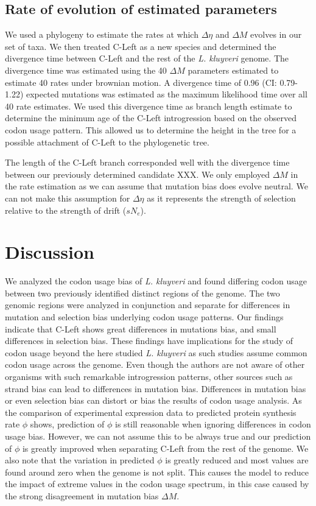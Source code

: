 \documentclass[12pt,draft]{article}
\begin{document}
\subsection*{Rate of evolution of estimated parameters}
We used a phylogeny to estimate the rates at which $\Delta \eta$ and $\Delta M$ evolves in our set of taxa. 
We then treated C-Left as a new species and determined the divergence time between C-Left and the rest of the \textit{L. kluyveri} genome.
The divergence time was estimated using the 40 $\Delta M$ parameters estimated to estimate 40 rates under brownian motion. 
A divergence time of 0.96 (CI: 0.79-1.22) expected mutations was estimated as the maximum likelihood time over all 40 rate estimates.
We used this divergence time as branch length estimate to determine the minimum age of the C-Left introgression based on the observed codon usage pattern.
This allowed us to determine the height in the tree for a possible attachment of C-Left to the phylogenetic tree.

The length of the C-Left branch corresponded well with the divergence time between our previously determined candidate XXX. 
We only employed $\Delta M$ in the rate estimation as we can assume that mutation bias does evolve neutral.
We can not make this assumption for $\Delta \eta$ as it represents the strength of selection relative to the strength of drift ($sN_e$).

\section*{Discussion}

We analyzed the codon usage bias of \textit{L. kluyveri} and found differing codon usage between two previously identified distinct regions of the genome. 
The two genomic regions were analyzed in conjunction and separate for differences in mutation and selection bias underlying codon usage patterns.
Our findings indicate that C-Left shows great differences in mutations bias, and small differences in selection bias.
These findings have implications for the study of codon usage beyond the here studied \textit{L. kluyveri} as such studies assume common codon usage across the genome.
Even though the authors are not aware of other organisms with such remarkable introgression patterns, other sources such as strand bias can lead to differences in mutation bias.
Differences in mutation bias or even selection bias can distort or bias the results of codon usage analysis. 
As the comparison of experimental expression data to predicted protein synthesis rate $\phi$ shows, prediction of $\phi$ is still reasonable when ignoring differences in codon usage bias. 
However, we can not assume this to be always true and our prediction of $\phi$ is greatly improved when separating C-Left from the rest of the genome.
We also note that the variation in predicted $\phi$ is greatly reduced and most values are found around zero when the genome is not split.
This causes the model to reduce the impact of extreme values in the codon usage spectrum, in this case caused by the strong disagreement in mutation bias $\Delta M$.
\end{document}
